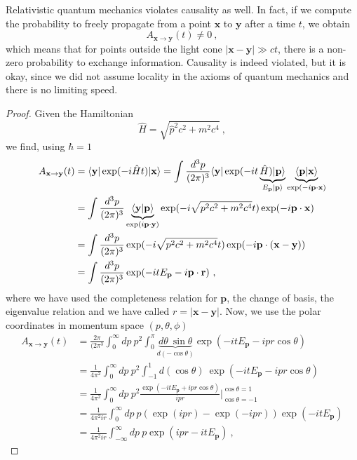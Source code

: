     Relativistic quantum mechanics violates causality as well. In fact, if we compute the probability to freely propagate from a point $\mathbf x$ to $\mathbf y$ after a time $t$, we obtain 
    \begin{equation*}
        A_{\mathbf x \rightarrow \mathbf y} (t) \neq 0 ~,
    \end{equation*}
    which means that for points outside the light cone $|\mathbf x - \mathbf y| \gg ct$, there is a non-zero probability to exchange information. Causality is indeed violated, but it is okay, since we did not assume locality in the axioms of quantum mechanics and there is no limiting speed.
    \begin{proof}
        Given the Hamiltonian 
        \begin{equation*}
            \hat H = \sqrt{\hat p^2 c^2 + m^2 c^4} ~,
        \end{equation*}
        we find, using $\hbar = 1$
        \begin{equation*}
        \begin{aligned}
            A_{\mathbf x \rightarrow \mathbf y} (t) & = \langle\mathbf y\vert \exp(- i \hat H t) \vert\mathbf x\rangle = \int \frac{d^3 p}{(2 \pi )^3} \langle\mathbf y\vert \exp(- i t \underbrace{\hat H) \vert\mathbf p\rangle}_{E_{\mathbf p} \vert\mathbf p\rangle} \underbrace{\langle\mathbf p\vert\mathbf x\rangle }_{\exp(- i \mathbf p \cdot \mathbf x)} \\ & = \int \frac{d^3 p}{(2 \pi )^3} \underbrace{\langle\mathbf y\vert\mathbf p\rangle}_{\exp( i \mathbf p \cdot \mathbf y)} \exp(- i \sqrt{p^2 c^2 + m^2 c^4} t)  \exp(- i \mathbf p \cdot \mathbf x) \\ & = \int \frac{d^3 p}{(2 \pi )^3} \exp(- i \sqrt{p^2 c^2 + m^2 c^4} t)  \exp(- i \mathbf p \cdot (\mathbf x - \mathbf y)) \\ & = \int \frac{d^3 p}{(2 \pi )^3} \exp(- i t E_{\mathbf p} - i \mathbf p \cdot \mathbf r) ~,
        \end{aligned}
        \end{equation*}
        where we have used the completeness relation for $\mathbf p$, the change of basis, the eigenvalue relation and we have called $r = |\mathbf x - \mathbf y|$. Now, we use the polar coordinates in momentum space $(p, \theta, \phi)$
        \begin{equation*}
        \begin{aligned}
            A_{\mathbf x \rightarrow \mathbf y} (t) & = \frac{2\pi}{(2 \pi^3} \int_0^\infty dp ~p^2 \int_0^\pi \underbrace{d\theta ~ \sin\theta}_{d (- \cos\theta)} \exp(- i t E_{\mathbf p} - i p r \cos \theta) \\ & = \frac{1}{4 \pi^2} \int_0^\infty dp ~p^2 \int_{-1}^1 d (\cos\theta) ~ \exp(- i t E_{\mathbf p} - i p r \cos \theta) \\ & = \frac{1}{4 \pi^2} \int_0^\infty dp ~p^2 \frac{\exp(- i t E_{\mathbf p} + i p r \cos \theta) }{i p r} \Big \vert_{\cos \theta = -1}^{\cos \theta = 1} \\ & = \frac{1}{4 \pi^2 i r} \int_0^\infty dp ~ p (\exp(i p r) - \exp(- i p r))\exp(- i t E_{\mathbf p}) \\ & = \frac{1}{4 \pi^2 i r} \int_{-\infty}^\infty dp ~ p \exp(i p r - i t E_{\mathbf p}) ~,

\end{aligned}
\end{equation*}
\end{proof}
